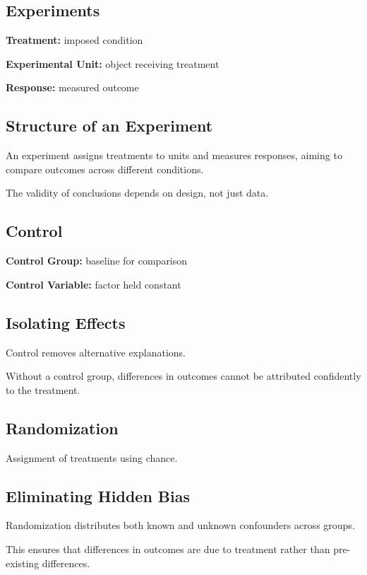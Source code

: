 \documentclass[11pt]{article}
\begin{document}
\begin{tcolorbox}[mybox]
\section*{Experiments}

\textbf{Treatment:} imposed condition  

\textbf{Experimental Unit:} object receiving treatment  

\textbf{Response:} measured outcome  

\subsection*{Structure of an Experiment}

An experiment assigns treatments to units and measures responses, aiming to compare outcomes across different conditions.

The validity of conclusions depends on design, not just data.
\end{tcolorbox}


\begin{tcolorbox}[mybox]
\section*{Control}

\textbf{Control Group:} baseline for comparison  

\textbf{Control Variable:} factor held constant  

\subsection*{Isolating Effects}

Control removes alternative explanations.

Without a control group, differences in outcomes cannot be attributed confidently to the treatment.
\end{tcolorbox}


\begin{tcolorbox}[mybox]
\section*{Randomization}

Assignment of treatments using chance.

\subsection*{Eliminating Hidden Bias}

Randomization distributes both known and unknown confounders across groups.

This ensures that differences in outcomes are due to treatment rather than pre-existing differences.
\end{tcolorbox}
\end{document}

